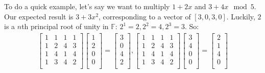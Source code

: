 \documentclass{article}
\begin{document}
To do a quick example, let's say we want to multiply $1+2x$ and $3+4x\mod 5$. Our expected result is $3+3x^2$, corresponding to a vector of $[3,0,3,0]$. Luckily, $2$ is a $n$th principal root of unity in $\mathbb{F}$: $2^1=2, 2^2=4, 2^3=3$. So:
\begin{align*}
    \begin{bmatrix}
        1 & 1 & 1 & 1 \\
        1 & 2 & 4 & 3 \\
        1 & 4 & 1 & 4 \\
        1 & 3 & 4 & 2 \\
    \end{bmatrix}
    \begin{bmatrix}
        1 \\
        2 \\
        0 \\
        0 \\
    \end{bmatrix}=
    \begin{bmatrix}
        3 \\
        0 \\
        4 \\
        2 \\
    \end{bmatrix}
    ,
    \begin{bmatrix}
        1 & 1 & 1 & 1 \\
        1 & 2 & 4 & 3 \\
        1 & 4 & 1 & 4 \\
        1 & 3 & 4 & 2 \\
    \end{bmatrix}
    \begin{bmatrix}
        3 \\
        4 \\
        0 \\
        0 \\
    \end{bmatrix}=
    \begin{bmatrix}
        2 \\
        1 \\
        4 \\
        0 \\
    \end{bmatrix}
\end{align*}
\end{document}
